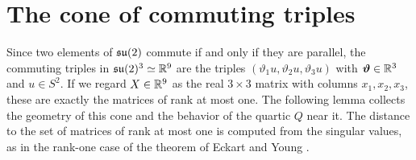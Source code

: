 \section{The cone of commuting triples}\label{ch27:sec:cone}

Since two elements of $\mathfrak{su}(2)$ commute if and only if they are parallel, the commuting triples in $\mathfrak{su}(2)^3\simeq\mathbb R^9$ are the triples $(\vartheta_1u,\vartheta_2u,\vartheta_3u)$ with $\bm\vartheta\in\mathbb R^3$ and $u\in S^2$. If we regard $X\in\mathbb R^9$ as the real $3\times3$ matrix with columns $x_1,x_2,x_3$, these are exactly the matrices of rank at most one. The following lemma collects the geometry of this cone and the behavior of the quartic $Q$ near it. The distance to the set of matrices of rank at most one is computed from the singular values, as in the rank-one case of the theorem of Eckart and Young \cite{EckartYoung1936}.


